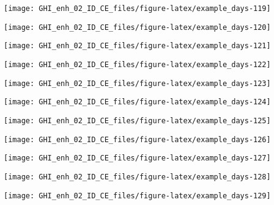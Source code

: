 \documentclass[
  10pt,
  a4paper,oneside]{article}
\begin{document}
\begin{center}\texttt{[image: GHI\_enh\_02\_ID\_CE\_files/figure-latex/example\_days-119]} \end{center}

\begin{center}\texttt{[image: GHI\_enh\_02\_ID\_CE\_files/figure-latex/example\_days-120]} \end{center}

\begin{center}\texttt{[image: GHI\_enh\_02\_ID\_CE\_files/figure-latex/example\_days-121]} \end{center}

\begin{center}\texttt{[image: GHI\_enh\_02\_ID\_CE\_files/figure-latex/example\_days-122]} \end{center}

\begin{center}\texttt{[image: GHI\_enh\_02\_ID\_CE\_files/figure-latex/example\_days-123]} \end{center}

\begin{center}\texttt{[image: GHI\_enh\_02\_ID\_CE\_files/figure-latex/example\_days-124]} \end{center}

\begin{center}\texttt{[image: GHI\_enh\_02\_ID\_CE\_files/figure-latex/example\_days-125]} \end{center}

\begin{center}\texttt{[image: GHI\_enh\_02\_ID\_CE\_files/figure-latex/example\_days-126]} \end{center}

\begin{center}\texttt{[image: GHI\_enh\_02\_ID\_CE\_files/figure-latex/example\_days-127]} \end{center}

\begin{center}\texttt{[image: GHI\_enh\_02\_ID\_CE\_files/figure-latex/example\_days-128]} \end{center}

\begin{center}\texttt{[image: GHI\_enh\_02\_ID\_CE\_files/figure-latex/example\_days-129]} \end{center}
\end{document}

